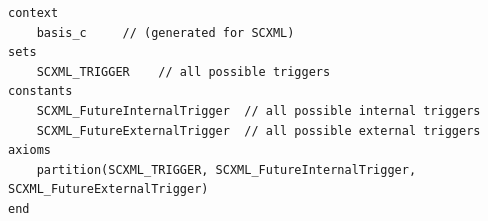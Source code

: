 \begin{lstlisting}[caption={Abstract basis context},label={lst:BasisContext}, language=Event-B, escapechar=|, frame=single, basicstyle=\rmfamily\scriptsize, belowskip=-2.0 \baselineskip, float=t]
context
	basis_c 	// (generated for SCXML)
sets
	SCXML_TRIGGER	 // all possible triggers
constants
	SCXML_FutureInternalTrigger	 // all possible internal triggers
	SCXML_FutureExternalTrigger	 // all possible external triggers  
axioms
	partition(SCXML_TRIGGER, SCXML_FutureInternalTrigger, SCXML_FutureExternalTrigger) 
end
\end{lstlisting}	


